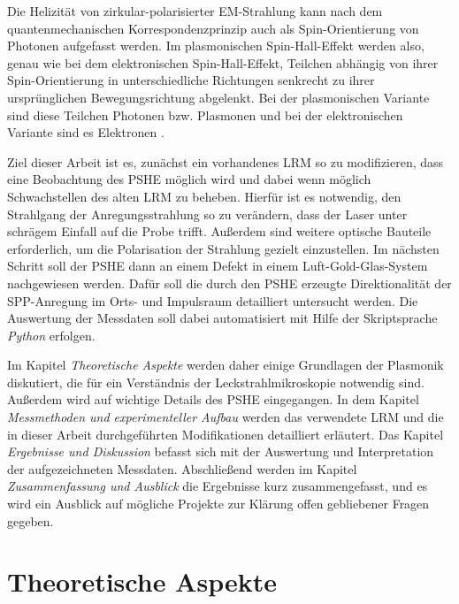 \documentclass[a4paper, titlepage,  ngerman]{book}
\begin{document}
	Die Helizität von zirkular-polarisierter EM-Strahlung kann nach dem quantenmechanischen Korrespondenzprinzip auch als Spin-Orientierung von Photonen aufgefasst werden.	Im plasmonischen Spin-Hall-Effekt werden also, genau wie bei dem elektronischen Spin-Hall-Effekt, Teilchen abhängig von ihrer Spin-Orientierung in unterschiedliche Richtungen senkrecht zu ihrer ursprünglichen Bewegungsrichtung abgelenkt. Bei der plasmonischen Variante sind diese Teilchen Photonen bzw. Plasmonen und bei der elektronischen Variante sind es Elektronen \cite{Inoue.2005}.
	
	Ziel dieser Arbeit ist es, zunächst ein vorhandenes LRM so zu modifizieren, dass eine Beobachtung des PSHE möglich wird und dabei wenn möglich Schwachstellen des alten LRM zu beheben. Hierfür ist es notwendig, den Strahlgang der Anregungsstrahlung so zu verändern, dass der Laser unter schrägem Einfall auf die Probe trifft. Außerdem sind weitere optische Bauteile erforderlich, um die Polarisation der Strahlung gezielt einzustellen. Im nächsten Schritt soll der PSHE dann an einem Defekt in einem Luft-Gold-Glas-System nachgewiesen werden. Dafür soll die durch den PSHE erzeugte Direktionalität der SPP-Anregung im Orts- und Impulsraum detailliert untersucht werden. Die Auswertung der Messdaten soll dabei automatisiert mit Hilfe der Skriptsprache \textit{Python} erfolgen.
	
	Im Kapitel \textit{Theoretische Aspekte} werden daher einige Grundlagen der Plasmonik diskutiert, die für ein Verständnis der Leckstrahlmikroskopie notwendig sind. Außerdem wird auf wichtige Details des PSHE eingegangen. In dem Kapitel \textit{Messmethoden und experimenteller Aufbau} werden das verwendete LRM und die in dieser Arbeit durchgeführten Modifikationen detailliert erläutert. Das Kapitel \textit{Ergebnisse und Diskussion} befasst sich mit der Auswertung und Interpretation der aufgezeichneten Messdaten.  Abschließend werden im Kapitel \textit{Zusammenfassung und Ausblick} die Ergebnisse kurz zusammengefasst, und es wird ein Ausblick auf mögliche Projekte zur Klärung offen gebliebener Fragen gegeben.
	
	\newpage	
	\chapter{Theoretische Aspekte}
\end{document}
